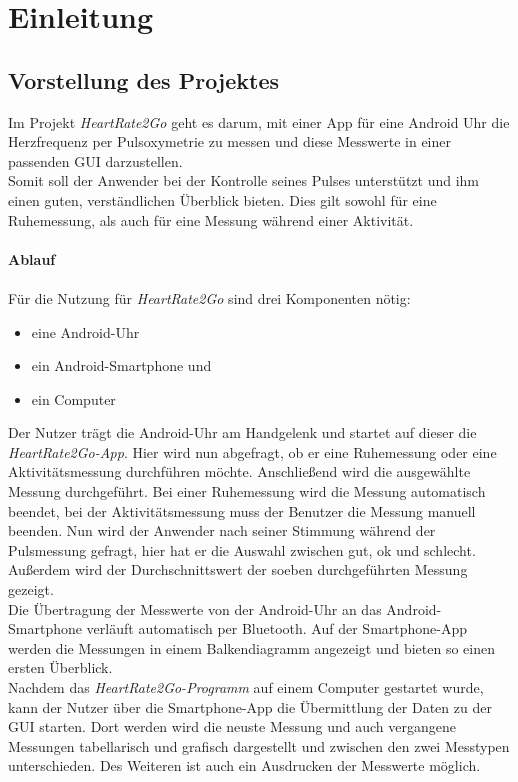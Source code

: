 \newpage
\section{Einleitung} \label{sec:Einleitung}
\subsection{Vorstellung des Projektes} \label{sec:Vorstellung des Projektes}
Im Projekt \textit{HeartRate2Go} geht es darum, mit einer App für eine Android Uhr die Herzfrequenz per Pulsoxymetrie zu messen und diese Messwerte in einer passenden GUI darzustellen. \\
Somit soll der Anwender bei der Kontrolle seines Pulses unterstützt und ihm einen guten, verständlichen Überblick bieten. Dies gilt sowohl für eine Ruhemessung, als auch für eine Messung während einer Aktivität. \\
\\
\textbf{Ablauf}\\
\\
Für die Nutzung für \textit{HeartRate2Go} sind drei Komponenten nötig:\\
\begin{itemize}
	\item eine Android-Uhr
	\item ein Android-Smartphone und
	\item ein Computer
\end{itemize}
Der Nutzer trägt die Android-Uhr am Handgelenk und startet auf dieser die \textit{HeartRate2Go-App}. Hier wird nun abgefragt, ob er eine Ruhemessung oder eine Aktivitätsmessung durchführen möchte. Anschließend wird die ausgewählte Messung durchgeführt. Bei einer Ruhemessung wird die Messung automatisch beendet, bei der Aktivitätsmessung muss der Benutzer die Messung manuell beenden. 
Nun wird der Anwender nach seiner Stimmung während der Pulsmessung gefragt, hier hat er die Auswahl zwischen gut, ok und schlecht. Außerdem wird der Durchschnittswert der soeben durchgeführten Messung gezeigt.\\
Die Übertragung der Messwerte von der Android-Uhr an das Android-Smartphone verläuft automatisch per Bluetooth. Auf der Smartphone-App werden die Messungen in einem Balkendiagramm angezeigt und bieten so einen ersten Überblick. \\
Nachdem das \textit{HeartRate2Go-Programm} auf einem Computer gestartet wurde, kann der Nutzer über die Smartphone-App die Übermittlung der Daten zu der GUI starten. Dort werden wird die neuste Messung und auch vergangene Messungen tabellarisch und grafisch dargestellt und zwischen den zwei Messtypen unterschieden. Des Weiteren ist auch ein Ausdrucken der Messwerte möglich.\\
\\  
